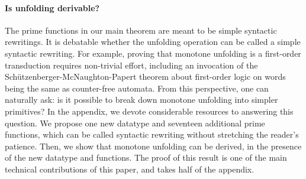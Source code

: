 \paragraph*{Is unfolding derivable?} The  prime functions in our main theorem  are meant to be simple syntactic rewritings. It is debatable whether the  unfolding operation can be called a simple syntactic rewriting. For example, proving that monotone unfolding is a first-order transduction requires non-trivial effort, including an invocation of the Sch\"utzenberger-McNaughton-Papert theorem about first-order logic on words being the same as counter-free automata. From this perspective, one can naturally ask: is it possible to break down monotone unfolding into simpler primitives?
In the appendix, we devote considerable resources to answering this question. We propose one new  datatype
and seventeen additional prime functions, which can be called syntactic rewriting without stretching the reader's patience. Then, we show that monotone unfolding can be derived, in the presence of  the new datatype and functions. The proof of this result is one of the main technical contributions of this paper, and takes half of the appendix.



